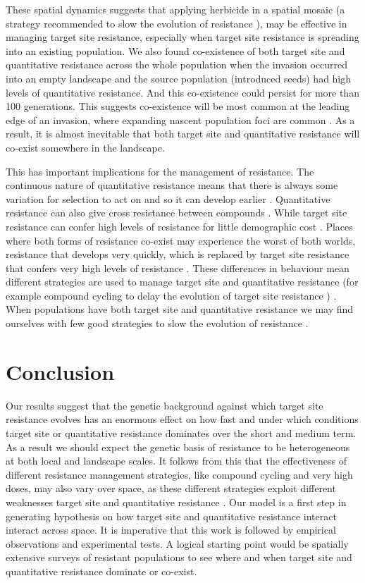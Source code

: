 \documentclass[10pt,letterpaper]{article}
\begin{document}
These spatial dynamics suggests that applying herbicide in a spatial mosaic (a strategy recommended to slow the evolution of resistance \cite{Rex2013}), may be effective in managing target site resistance, especially when target site resistance is spreading into an existing population. We also found co-existence of both target site and quantitative resistance across the whole population when the invasion occurred into an empty landscape and the source population (introduced seeds) had high levels of quantitative resistance. And this co-existence could persist for more than 100 generations. This suggests co-existence will be most common at the leading edge of an invasion, where expanding nascent population foci are common \cite{Mooy1988}. As a result, it is almost inevitable that both target site and quantitative resistance will co-exist somewhere in the landscape.

This has important implications for the management of resistance. The continuous nature of quantitative resistance means that there is always some variation for selection to act on and so it can develop earlier \cite{Dely2010newPhy}. Quantitative resistance can also give cross resistance between compounds \cite{Bauc2016, Neve2007}. While target site resistance can confer high levels of resistance for little demographic cost \cite{Bauc2016}. Places where both forms of resistance co-exist may experience the worst of both worlds, resistance that develops very quickly, which is replaced by target site resistance that confers very high levels of resistance \cite{Vera2015}. These differences in behaviour mean different strategies are used to manage target site and quantitative resistance (for example compound cycling to delay the evolution of target site resistance \cite{Rex2013}) \cite{Gard1998}. When populations have both target site and quantitative resistance we may find ourselves with few good strategies to slow the evolution of resistance \cite{Gard1998}. 

\section*{Conclusion}
Our results suggest that the genetic background against which target site resistance evolves has an enormous effect on how fast and under which conditions target site or quantitative resistance dominates over the short and medium term. As a result we should expect the genetic basis of resistance to be heterogeneous at both local and landscape scales. It follows from this that the effectiveness of different resistance management strategies, like compound cycling and very high doses, may also vary over space, as these different strategies exploit different weaknesses target site and quantitative resistance \cite{Gard1998, Rex2013}. Our model is a first step in generating hypothesis on how target site and quantitative resistance interact interact across space. It is imperative that this work is followed by empirical observations and experimental tests. A logical starting point would be spatially extensive surveys of resistant populations to see where and when target site and quantitative resistance dominate or co-exist.
\end{document}
